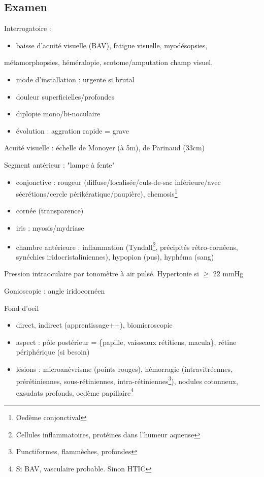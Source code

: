 \documentclass[11pt]{article}
\begin{document}
\subsection{Examen}
\label{sec:org6b75f5c}
Interrogatoire : 
\begin{itemize}
\item baisse d'acuité visuelle (BAV), fatigue visuelle, myodésopsies,
\end{itemize}
métamorphopsies, héméralopie, scotome/amputation champ visuel, 
\begin{itemize}
\item mode d'installation : urgente si brutal
\item douleur superficielles/profondes
\item diplopie mono/bi-noculaire
\item évolution : aggration rapide = grave
\end{itemize}
Acuité visuelle : échelle de Monoyer (à 5m), de Parinaud (33cm)

Segment antérieur : "lampe à fente"
\begin{itemize}
\item conjonctive : rougeur (diffuse/localisée/culs-de-sac inférieure/avec
sécrétions/cercle périkératique/paupière), chemosis\footnote{Oedème conjonctival}
\item cornée (transparence)
\item iris : myosis/mydriase
\item chambre antérieure : inflammation (Tyndall\footnote{Cellules inflammatoires, protéines dans l'humeur aqueuse}, précipités rétro-cornéens,
synéchies iridocristaliniennes), hypopion (pus), hyphéma (sang)
\end{itemize}
Pression intraoculaire par tonomètre à air pulsé. Hypertonie si \(\ge\) 22 mmHg

Gonioscopie : angle iridocornéen

Fond d'oeil
\begin{itemize}
\item direct, indirect (apprentissage++), biomicroscopie
\item aspect : pôle postérieur = \{papille, vaisseaux rétitiens, macula\}, rétine
périphérique (si besoin)
\item lésions : microanévrisme (points rouges), hémorragie (intravitréennes,
prérétiniennes, sous-rétiniennes, intra-rétiniennes\footnote{Punctiformes, flammèches, profondes}), nodules cotonneux,
exsudats profonds, oedème papillaire\footnote{Si BAV, vasculaire probable. Sinon HTIC}
\end{itemize}
\end{document}
